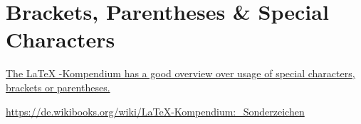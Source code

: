 \section{Brackets, Parentheses \& Special Characters}
\href{https://de.wikibooks.org/wiki/LaTeX-Kompendium:\_Sonderzeichen}{The \LaTeX
-Kompendium has a good overview over usage of special characters, brackets or
parentheses.}
\begin{tst-default-list}
\item{\href{https://de.wikibooks.org/wiki/LaTeX-Kompendium:\_Sonderzeichen}
{https://de.wikibooks.org/wiki/LaTeX-Kompendium:\_Sonderzeichen}
}
\end{tst-default-list}
